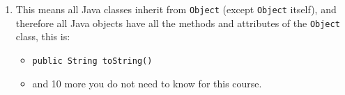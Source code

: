 \documentclass[a4paper, 9pt]{extarticle}
\begin{document}
\begin{enumerate}
  \item This means all Java classes inherit from \verb+Object+ (except
    \verb+Object+ itself), and therefore all Java objects have all the methods
    and attributes of the \verb+Object+ class, this is:

      \begin{itemize}

        \item \verb+public String toString()+

        \item and 10 more you do not need to know for this course.

      \end{itemize}

\end{enumerate}
\end{document}
